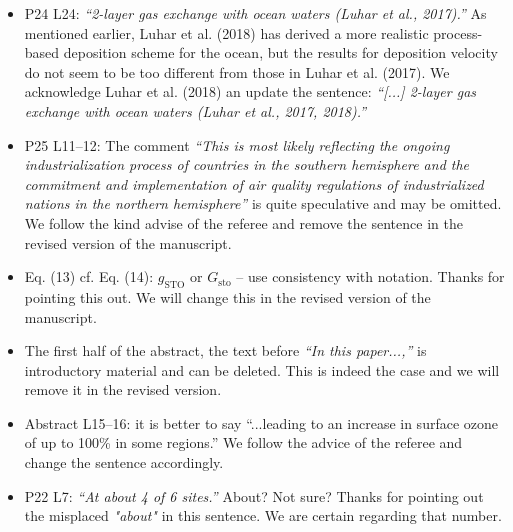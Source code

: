 \begin{itemize}
\item {\color{blue}  P24 L24: \emph{“2-layer gas exchange with ocean waters (Luhar et al., 2017).”}
As mentioned earlier, Luhar et al. (2018) has derived a more realistic process-based
deposition scheme for the ocean, but the results for deposition velocity do not seem to
be too different from those in Luhar et al. (2017).}
  We acknowledge Luhar et al. (2018) an update the sentence:
  \emph{“[...] 2-layer gas exchange with ocean waters (Luhar et al., 2017, 2018).”}
  
\item {\color{blue}  P25 L11--12: The comment \emph{“This is most likely reflecting the ongoing
industrialization process of countries in the southern hemisphere and the commitment
and implementation of air quality regulations of industrialized nations in the northern
hemisphere”} is quite speculative and may be omitted.}
  We follow the kind advise of the referee and remove the sentence in the revised version of the manuscript.
  
\item {\color{blue}  Eq. (13) cf. Eq. (14): $g_\mathrm{STO}$ or $G_\mathrm{sto}$ -- use consistency with notation.}
  Thanks for pointing this out. We will change this in the revised version of the manuscript.
  
\item {\color{blue}  The first half of the abstract, the text before \emph{“In this paper...,”} is introductory
  material and can be deleted.}
  This is indeed the case and we will remove it in the revised version.
  
\item {\color{blue}  Abstract L15--16: it is better to say “...leading to an increase in surface
  ozone of up to 100\% in some regions.”}
  We follow the advice of the referee and change the sentence accordingly.
  
\item {\color{blue}  P22 L7: \emph{“At about 4 of 6 sites.”} About? Not sure?}
  Thanks for pointing out the misplaced \emph{"about"} in this sentence. We are certain regarding that number. 
  
\end{itemize}
\newpage

%
